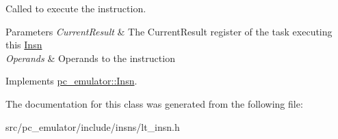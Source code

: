 Called to execute the instruction. 


\begin{DoxyParams}{Parameters}
{\em Current\+Result} & The Current\+Result register of the task executing this \hyperlink{classpc__emulator_1_1Insn}{Insn} \\
\hline
{\em Operands} & Operands to the instruction \\
\hline
\end{DoxyParams}


Implements \hyperlink{classpc__emulator_1_1Insn_a103d27030e872a799e313df16c1f3d66}{pc\+\_\+emulator\+::\+Insn}.



The documentation for this class was generated from the following file\+:\begin{DoxyCompactItemize}
\item 
src/pc\+\_\+emulator/include/insns/lt\+\_\+insn.\+h\end{DoxyCompactItemize}
